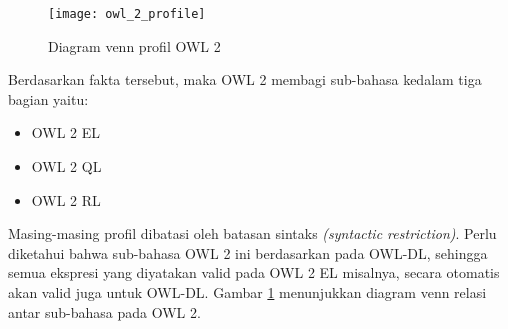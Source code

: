 \begin{figure}[hb]
	\centering
	\texttt{[image: owl\_2\_profile]}
	\caption{Diagram venn profil OWL 2}
	\label{fig:owl_2_profile}
\end{figure}

Berdasarkan fakta tersebut, maka OWL 2 membagi sub-bahasa kedalam tiga bagian yaitu:
\begin{itemize}
	\item OWL 2 EL
	\item OWL 2 QL
	\item OWL 2 RL
\end{itemize}

Masing-masing profil dibatasi oleh batasan sintaks \emph{(syntactic restriction)}. Perlu diketahui bahwa sub-bahasa OWL 2 ini berdasarkan pada OWL-DL, sehingga semua ekspresi yang diyatakan valid pada OWL 2 EL misalnya, secara otomatis akan valid juga untuk OWL-DL. Gambar \ref{fig:owl_2_profile} menunjukkan diagram venn relasi antar sub-bahasa pada OWL 2.
